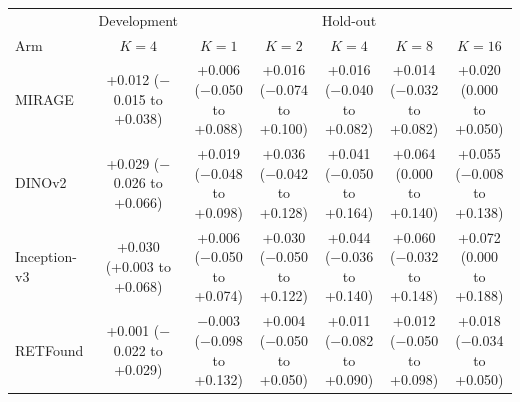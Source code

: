 \begin{tabular}{@{}lcccccc@{}}
\toprule
 & Development & \multicolumn{5}{c}{Hold-out} \\ \cmidrule(lr){2-2}\cmidrule(l){3-7}
Arm & $K=4$ & $K=1$ & $K=2$ & $K=4$ & $K=8$ & $K=16$ \\
\midrule
MIRAGE & \makecell{+0.012\\{\scriptsize ($-$0.015 to +0.038)}} & \makecell{+0.006\\{\scriptsize ($-$0.050 to +0.088)}} & \makecell{+0.016\\{\scriptsize ($-$0.074 to +0.100)}} & \makecell{+0.016\\{\scriptsize ($-$0.040 to +0.082)}} & \makecell{+0.014\\{\scriptsize ($-$0.032 to +0.082)}} & \makecell{+0.020\\{\scriptsize (0.000 to +0.050)}} \\
DINOv2 & \makecell{+0.029\\{\scriptsize ($-$0.026 to +0.066)}} & \makecell{+0.019\\{\scriptsize ($-$0.048 to +0.098)}} & \makecell{+0.036\\{\scriptsize ($-$0.042 to +0.128)}} & \makecell{+0.041\\{\scriptsize ($-$0.050 to +0.164)}} & \makecell{+0.064\\{\scriptsize (0.000 to +0.140)}} & \makecell{+0.055\\{\scriptsize ($-$0.008 to +0.138)}} \\
Inception-v3 & \makecell{+0.030\\{\scriptsize (+0.003 to +0.068)}} & \makecell{+0.006\\{\scriptsize ($-$0.050 to +0.074)}} & \makecell{+0.030\\{\scriptsize ($-$0.050 to +0.122)}} & \makecell{+0.044\\{\scriptsize ($-$0.036 to +0.140)}} & \makecell{+0.060\\{\scriptsize ($-$0.032 to +0.148)}} & \makecell{+0.072\\{\scriptsize (0.000 to +0.188)}} \\
RETFound & \makecell{+0.001\\{\scriptsize ($-$0.022 to +0.029)}} & \makecell{$-$0.003\\{\scriptsize ($-$0.098 to +0.132)}} & \makecell{+0.004\\{\scriptsize ($-$0.050 to +0.050)}} & \makecell{+0.011\\{\scriptsize ($-$0.082 to +0.090)}} & \makecell{+0.012\\{\scriptsize ($-$0.050 to +0.098)}} & \makecell{+0.018\\{\scriptsize ($-$0.034 to +0.050)}} \\
\bottomrule
\end{tabular}
